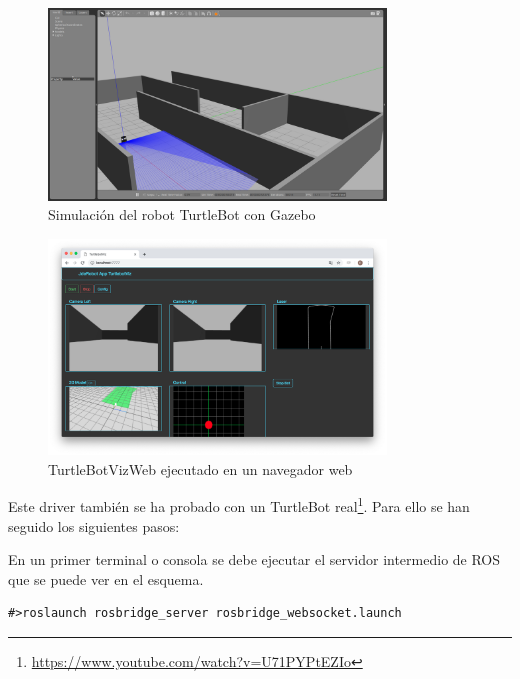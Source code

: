 \begin{figure}[H]
  \begin{center}
    \includegraphics[width=0.8\textwidth]{figures/gazeboturtle.png}
    		\caption{Simulación del robot TurtleBot con Gazebo}
		\label{fig.gazeboturtle}
		\end{center}
\end{figure}
\begin{figure}[H]
  \begin{center}
    \includegraphics[width=0.8\textwidth]{figures/TurtleBotviznode.png}
    		\caption{TurtleBotVizWeb ejecutado en un navegador web}
		\label{fig.TurtleBotviznode}
		\end{center}
\end{figure}

Este driver también se ha probado con un TurtleBot real\footnote{\url{https://www.youtube.com/watch?v=U71PYPtEZIo}}. Para ello se han seguido los siguientes pasos:

En un primer terminal o consola se debe ejecutar el servidor intermedio de ROS que se puede ver en el esquema.
\begin{lstlisting}[caption= Ejecución del servidor intermedio, label=cod.servidorintermedioTurtleBot]
#>roslaunch rosbridge_server rosbridge_websocket.launch
\end{lstlisting}

